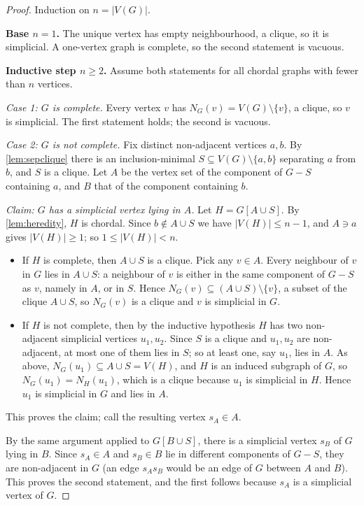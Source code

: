 \documentclass[11pt]{article}
\numberwithin{equation}{section}
\theoremstyle{plain}
\newcommand{\V}{V}
\begin{document}
\begin{proof}
Induction on $n=|\V(G)|$.

\textbf{Base $n=1$.} The unique vertex has empty neighbourhood, a clique, so it is
simplicial. A one-vertex graph is complete, so the second statement is vacuous.

\textbf{Inductive step $n\ge 2$.} Assume both statements for all chordal graphs with
fewer than $n$ vertices.

\emph{Case 1: $G$ is complete.} Every vertex $v$ has $N_G(v)=\V(G)\setminus\{v\}$, a
clique, so $v$ is simplicial. The first statement holds; the second is vacuous.

\emph{Case 2: $G$ is not complete.} Fix distinct non-adjacent vertices $a,b$. By
\cref{lem:sepclique} there is an inclusion-minimal $S\subseteq\V(G)\setminus\{a,b\}$
separating $a$ from $b$, and $S$ is a clique. Let $A$ be the vertex set of the component
of $G-S$ containing $a$, and $B$ that of the component containing $b$.

\smallskip
\emph{Claim: $G$ has a simplicial vertex lying in $A$.} Let $H=G[A\cup S]$. By
\cref{lem:heredity}, $H$ is chordal. Since $b\notin A\cup S$ we have $|\V(H)|\le n-1$,
and $A\ni a$ gives $|\V(H)|\ge 1$; so $1\le|\V(H)|<n$.
\begin{itemize}[leftmargin=1.4em,itemsep=0.3ex]
\item If $H$ is complete, then $A\cup S$ is a clique. Pick any $v\in A$. Every neighbour
of $v$ in $G$ lies in $A\cup S$: a neighbour of $v$ is either in the same component of
$G-S$ as $v$, namely in $A$, or in $S$. Hence $N_G(v)\subseteq(A\cup S)\setminus\{v\}$,
a subset of the clique $A\cup S$, so $N_G(v)$ is a clique and $v$ is simplicial in $G$.
\item If $H$ is not complete, then by the inductive hypothesis $H$ has two non-adjacent
simplicial vertices $u_1,u_2$. Since $S$ is a clique and $u_1,u_2$ are non-adjacent, at
most one of them lies in $S$; so at least one, say $u_1$, lies in $A$. As above,
$N_G(u_1)\subseteq A\cup S=\V(H)$, and $H$ is an induced subgraph of $G$, so
$N_G(u_1)=N_H(u_1)$, which is a clique because $u_1$ is simplicial in $H$. Hence $u_1$
is simplicial in $G$ and lies in $A$.
\end{itemize}
This proves the claim; call the resulting vertex $s_A\in A$.

By the same argument applied to $G[B\cup S]$, there is a simplicial vertex $s_B$ of $G$
lying in $B$. Since $s_A\in A$ and $s_B\in B$ lie in different components of $G-S$, they
are non-adjacent in $G$ (an edge $s_As_B$ would be an edge of $G$ between $A$ and $B$).
This proves the second statement, and the first follows because $s_A$ is a simplicial
vertex of $G$.
\end{proof}
\end{document}
